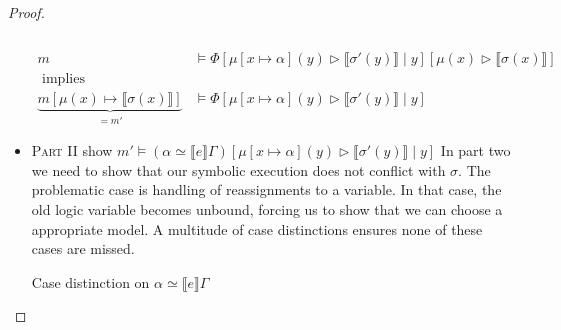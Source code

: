 \documentclass[twoside, english]{sdqthesis}
\newcommand{\bbracket}[1]{\llbracket #1 \rrbracket}
\newcommand{\tr}[0]{\triangleright}
\theoremstyle{definition}
\begin{document}
\begin{proof}
\begin{itemize}
\begin{align*}
            [\mu(x) \tr \bbracket{\sigma(x)}]
          \\
        \\ m & \vDash \Phi
          [\mu[x \mapsto \alpha](y) \tr \bbracket{\sigma'(y)} \mid y]
          [\mu(x) \tr \bbracket{\sigma(x)}] 
        \\ \text{ implies } 
        \\\underbrace{m[\mu(x) \mapsto \bbracket{\sigma(x)}]}_{= m'} & \vDash \Phi
            [\mu[x \mapsto \alpha](y) \tr \bbracket{\sigma'(y)} \mid y]
      \end{align*}
    \item \textsc{Part II} show $m' \vDash (\alpha \simeq \bbracket{e}\Gamma)[\mu[x\mapsto \alpha](y) \tr \bbracket{\sigma'(y)} \mid y]$
      In part two we need to show that our symbolic execution does not conflict with $\sigma$. 
      The problematic case is handling of reassignments to a variable. In that case, the old logic variable becomes unbound, forcing us to show that we can choose a appropriate model.
      A multitude of case distinctions ensures none of these cases are missed.

      Case distinction on $\alpha \simeq \bbracket{e}\Gamma$


\end{itemize}
\end{proof}
\end{document}

